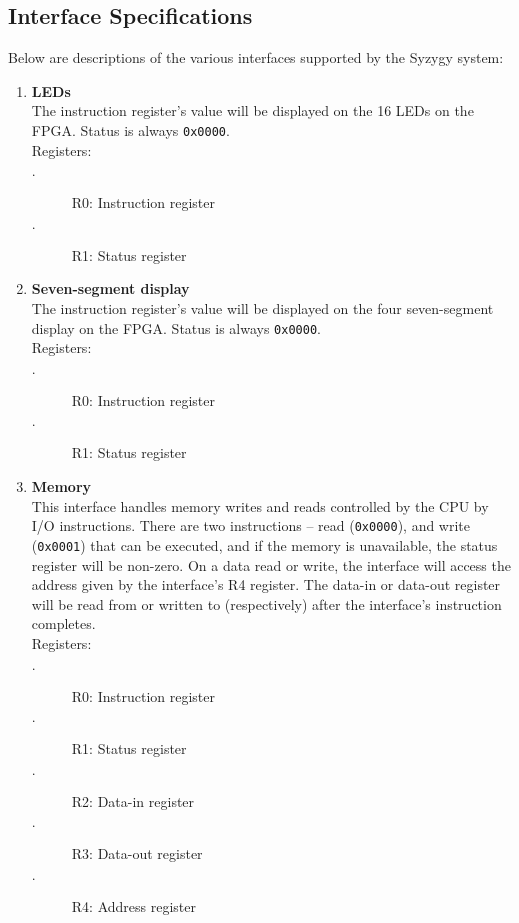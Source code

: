 \documentclass{article}
\begin{document}
		\subsection{Interface Specifications}

			Below are descriptions of the various interfaces supported by the Syzygy system:

			\begin{enumerate}
				
				\item \textbf{LEDs}\\
				The instruction register's value will be displayed on the 16 LEDs on the FPGA. Status is always \texttt{0x0000}.\\
				Registers:
				\begin{description}
					\item[$\cdot$] R0: Instruction register
					\item[$\cdot$] R1: Status register
				\end{description}
			
				\item \textbf{Seven-segment display}\\
				The instruction register's value will be displayed on the four seven-segment display on the FPGA. Status is always \texttt{0x0000}.\\
				Registers:
				\begin{description}
					\item[$\cdot$] R0: Instruction register 
					\item[$\cdot$] R1: Status register
				\end{description}
			
				\item \textbf{Memory}\\
				This interface handles memory writes and reads controlled by the CPU by I/O instructions. There are two instructions -- read (\texttt{0x0000}), and write (\texttt{0x0001}) that can be executed, and if the memory is unavailable, the status register will be non-zero. On a data read or write, the interface will access the address given by the interface's R4 register. The data-in or data-out register will be read from or written to (respectively) after the interface's instruction completes.\\
				Registers:
				\begin{description}
					\item[$\cdot$] R0: Instruction register
					\item[$\cdot$] R1: Status register
					\item[$\cdot$] R2: Data-in register
					\item[$\cdot$] R3: Data-out register
					\item[$\cdot$] R4: Address register
				\end{description}
			

\end{enumerate}
\end{document}
